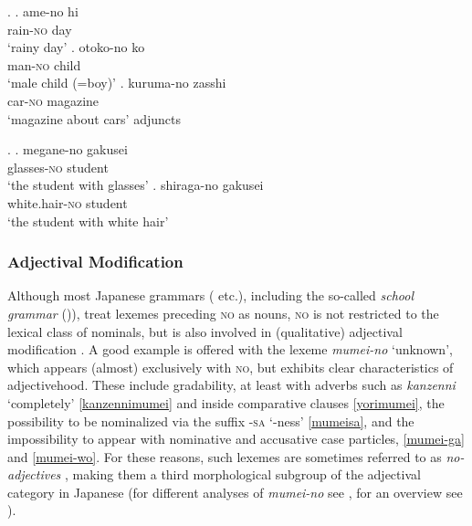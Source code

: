 \documentclass [output=book,colorlinks,citecolor=brown]{langscibook}
\begin{document}
 \ex. \label{adjunct no} \ag. ame-no hi\\
rain-\textsc{no} day\\
`rainy day' \null \hfill \citep[251]{saito:2008:N}
\cg. otoko-no ko\\
man-\textsc{no} child\\
`male child (=boy)'
\cg. kuruma-no zasshi\\
car-\textsc{no} magazine\\
`magazine about cars' \null \hfill adjuncts

\ex. \label{alienable} \ag. megane-no gakusei\\
glasses-\textsc{no} student\\
`the student with glasses'
\bg. shiraga-no gakusei\\
white.hair-\textsc{no} student\\
`the student with white hair' \\ \null \hfill \citep[96]{kato:2003:nihongo}

\subsubsection{Adjectival Modification}

Although most Japanese grammars (\citealt{iwasaki:2013:japanese, tsujimura:2014:intro, hasegawa:2015:japanese} etc.), including the so-called \textit{school grammar} (\citealt{hashimoto:1948:kokugogaku})), treat lexemes preceding \textsc{no} as nouns, \textsc{no} is not restricted to the lexical class of nominals, but is also involved in (qualitative) adjectival modification \citep{muraki:2012:nihongo, oshima:2019:gradability}. A good example is offered with the lexeme \textit{mumei-no} `unknown’, which appears (almost) exclusively with \textsc{no}, but exhibits clear characteristics of adjectivehood. These include gradability, at least with adverbs such as \textit{kanzenni} `completely’ \ref{kanzennimumei} and inside comparative clauses \ref{yorimumei}, the possibility to be nominalized via the suffix -\textsc{sa} `-ness’ \ref{mumeisa}, and the impossibility to appear with nominative and accusative case particles, \ref{mumei-ga} and \ref{mumei-wo}. For these reasons, such lexemes are sometimes referred to as \textit{no-adjectives} \citep{mio:1942:hanashi, mio:1958:hanashi, muraki:2012:nihongo}, making them a third morphological subgroup of the adjectival category in Japanese (for different analyses of \textit{mumei-no} see \citealt{teramura:1982:nihongo, kato:2003:nihongo, morita:2013:morph}, for an overview see \citealt{kohlich:2023:suppl}). %
\end{document}
